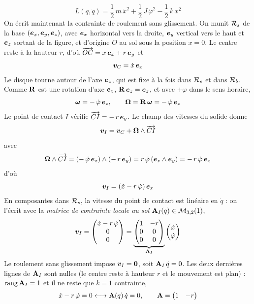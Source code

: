 \[
    L(q,\dot q) = \frac12\,m\,\dot x^2 + \frac12\,J\,\dot\varphi^2
    - \frac12\,k\,x^2
\]
On écrit maintenant la contrainte de roulement sans glissement. On
munit $\mathcal{R}_{s}$ de la base $(\bm{e}_x,\bm{e}_y,\bm{e}_z)$, avec
$\bm{e}_x$ horizontal vers la droite, $\bm{e}_y$ vertical vers le
haut et $\bm{e}_z$ sortant de la figure, et d'origine $O$ au sol
sous la position $x = 0$. Le centre reste à la hauteur $r$, d'où $\overrightarrow{OC} = x\,\bm{e}_x + r\,\bm{e}_y$
et
\[
    \bm{v}_C = \dot x\,\bm{e}_x
\]
Le disque tourne autour de l'axe $\bm{e}_z$, qui est fixe à la fois dans
$\mathcal{R}_{s}$ et dans $\mathcal{R}_{b}$. Comme $\mathbf{R}$ est une rotation d'axe
$\bm{e}_z$, $\mathbf{R}\,\bm{e}_z = \bm{e}_z$, et avec $+ \varphi$ dans le sens horaire,
\[
    \bm{\omega} = -\,\dot\varphi\,\bm{e}_z,
    \qquad
    \bm{\Omega} = \mathbf{R}\,\bm{\omega} = -\,\dot\varphi\,\bm{e}_z
\]
Le point de contact $I$ vérifie $\overrightarrow{CI} = -\,r\,\bm{e}_y$.
Le champ des vitesses du solide donne
\[
    \bm{v}_I = \bm{v}_C + \bm{\Omega}\wedge\overrightarrow{CI}
\]
avec
\[
    \bm{\Omega}\wedge\overrightarrow{CI}
    = (-\,\dot\varphi\,\bm{e}_z)\wedge(-\,r\,\bm{e}_y)
    = r\,\dot\varphi\,(\bm{e}_z\wedge\bm{e}_y)
    = -\,r\,\dot\varphi\,\bm{e}_x
\]
d'où
\[
    \bm{v}_I = (\dot x - r\,\dot\varphi)\,\bm{e}_x
\]
En composantes dans $\mathcal{R}_{s}$, la vitesse du point de contact est
linéaire en $\dot q$ : on l'écrit avec la \emph{matrice de contrainte
locale au sol} $\mathbf{A}_I(q)\in\mathcal{M}_{3,2}(1)$,
\[
    \bm{v}_I
    = \begin{pmatrix} \dot x - r\,\dot\varphi\\ 0\\ 0 \end{pmatrix}
    = \underbrace{\begin{pmatrix}
        1 & -r\\ 0 & 0\\ 0 & 0
    \end{pmatrix}}_{\mathbf{A}_I}
    \begin{pmatrix} \dot x\\ \dot\varphi \end{pmatrix}
\]
Le roulement sans glissement impose $\bm{v}_I = \bm{0}$, soit
$\mathbf{A}_I\,\dot q = 0$. Les deux dernières lignes de $\mathbf{A}_I$ sont
nulles (le centre reste à hauteur $r$ et le mouvement est plan) :
$\operatorname{rang}\mathbf{A}_I = 1$ et il ne reste que $k = 1$ contrainte,
\[
    \dot x - r\,\dot\varphi = 0
    \longleftrightarrow
    \mathbf{A}(q)\,\dot q = 0,
    \qquad
    \mathbf{A} = \begin{pmatrix} 1 & -r \end{pmatrix}
\]

